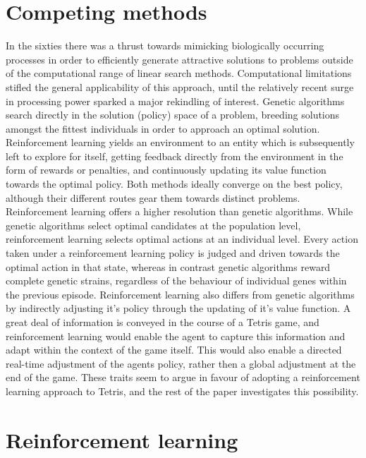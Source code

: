 \documentclass[a4paper]{article}%
\begin{document}
\section{Competing methods}
In the sixties there was a thrust towards mimicking biologically occurring processes\citep[pg. 7]{evvsrl} in order to efficiently generate attractive solutions to problems outside of the computational range of linear search methods. Computational limitations stifled the general applicability of this approach, until the relatively recent surge in processing power sparked a major rekindling of interest.  Genetic algorithms search directly in the solution (policy) space of a problem, breeding solutions amongst the fittest individuals in order to approach an optimal solution. Reinforcement learning yields an environment to an entity which is subsequently left to explore for itself, getting feedback directly from the environment in the form of rewards or penalties, and continuously updating its value function towards the optimal policy. Both methods ideally converge on the best policy\citep{evvsrl}, although their different routes gear them towards distinct problems. Reinforcement learning offers a higher resolution than genetic algorithms. While genetic algorithms select optimal candidates at the population level, reinforcement learning  selects optimal actions at an individual level\citep{evvsrl}. Every action taken under a reinforcement learning policy is judged and driven towards the optimal action in that state, whereas in contrast genetic algorithms reward complete genetic strains, regardless of the behaviour of individual genes within the previous episode. Reinforcement learning also differs from genetic algorithms by indirectly adjusting it's policy through the updating of it's value function. A great deal of information is conveyed in the course of a Tetris game, and reinforcement learning would enable the agent to capture this information and adapt within the context of the game itself. This would also enable a directed real-time adjustment of the agents policy, rather then a global adjustment at the end of the game. These traits seem to argue in favour of adopting a reinforcement learning approach to Tetris, and the rest of the paper investigates this possibility.

\section{Reinforcement learning}
\end{document}
